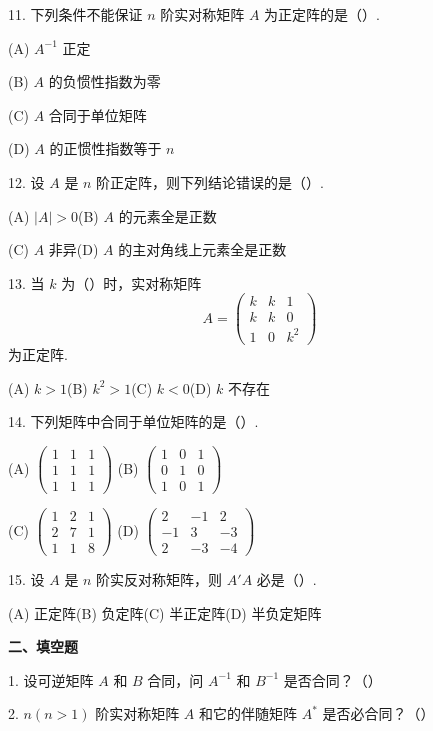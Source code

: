 \documentclass[UTF8, 12pt, fontset=fandol, oneside]{ctexart}
\begin{document}
11. 下列条件不能保证 $n$ 阶实对称矩阵 $A$ 为正定阵的是（\quad ）.

(A) $A^{-1}$ 正定

(B) $A$ 的负惯性指数为零

(C) $A$ 合同于单位矩阵

(D) $A$ 的正惯性指数等于 $n$

12. 设 $A$ 是 $n$ 阶正定阵，则下列结论错误的是（\quad ）.

(A) $|A|>0$\qquad (B) $A$ 的元素全是正数

(C) $A$ 非异\qquad (D) $A$ 的主对角线上元素全是正数

13. 当 $k$ 为（\quad ）时，实对称矩阵
\[
A=\left(\begin{array}{ccc}
k & k & 1\\
k & k & 0\\
1 & 0 & k^2
\end{array}\right)
\]
为正定阵.

(A) $k>1$\qquad (B) $k^2>1$\qquad (C) $k<0$\qquad (D) $k$ 不存在

14. 下列矩阵中合同于单位矩阵的是（\quad ）.

(A) $\left(\begin{array}{ccc}1&1&1\\ 1&1&1\\ 1&1&1\end{array}\right)$
\qquad
(B) $\left(\begin{array}{ccc}1&0&1\\ 0&1&0\\ 1&0&1\end{array}\right)$

(C) $\left(\begin{array}{ccc}1&2&1\\ 2&7&1\\ 1&1&8\end{array}\right)$
\qquad
(D) $\left(\begin{array}{ccc}2&-1&2\\ -1&3&-3\\ 2&-3&-4\end{array}\right)$

15. 设 $A$ 是 $n$ 阶实反对称矩阵，则 $A'A$ 必是（\quad ）.

(A) 正定阵\qquad (B) 负定阵\qquad (C) 半正定阵\qquad (D) 半负定矩阵

\noindent\textbf{二、填空题}

1. 设可逆矩阵 $A$ 和 $B$ 合同，问 $A^{-1}$ 和 $B^{-1}$ 是否合同？（\quad ）

2. $n(n>1)$ 阶实对称矩阵 $A$ 和它的伴随矩阵 $A^*$ 是否必合同？（\quad ）
\end{document}
